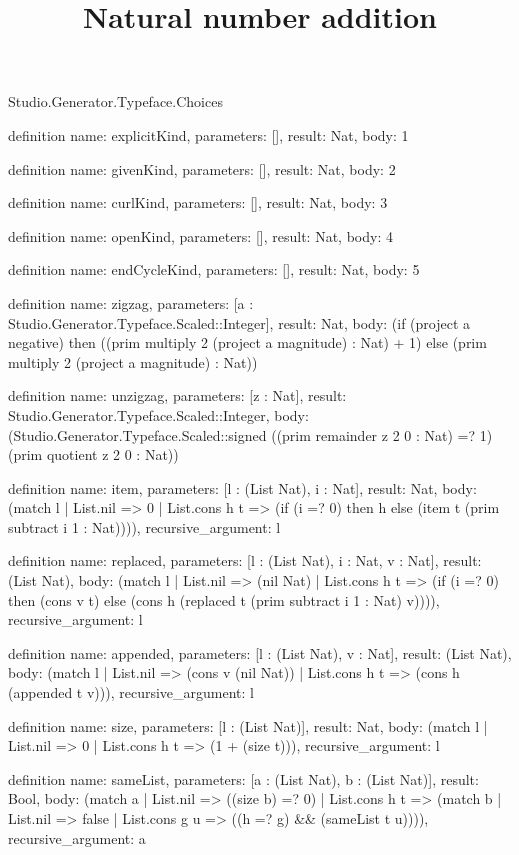 \begin{lexlean}{Studio.Generator.Typeface.Choices}
\title{Natural number addition}
\begin{semanticmodule}
definition{
  name: explicitKind,
  parameters: [],
  result: Nat,
  body: 1
}

definition{
  name: givenKind,
  parameters: [],
  result: Nat,
  body: 2
}

definition{
  name: curlKind,
  parameters: [],
  result: Nat,
  body: 3
}

definition{
  name: openKind,
  parameters: [],
  result: Nat,
  body: 4
}

definition{
  name: endCycleKind,
  parameters: [],
  result: Nat,
  body: 5
}

definition{
  name: zigzag,
  parameters: [a : Studio.Generator.Typeface.Scaled::Integer],
  result: Nat,
  body: (if (project a negative) then ((prim multiply 2 (project a magnitude) : Nat) + 1) else (prim multiply 2 (project a magnitude) : Nat))
}

definition{
  name: unzigzag,
  parameters: [z : Nat],
  result: Studio.Generator.Typeface.Scaled::Integer,
  body: (Studio.Generator.Typeface.Scaled::signed ((prim remainder z 2 0 : Nat) =? 1) (prim quotient z 2 0 : Nat))
}

definition{
  name: item,
  parameters: [l : (List Nat), i : Nat],
  result: Nat,
  body: (match l
    | List.nil => 0
    | List.cons h t => (if (i =? 0) then h else (item t (prim subtract i 1 : Nat)))),
  recursive_argument: l
}

definition{
  name: replaced,
  parameters: [l : (List Nat), i : Nat, v : Nat],
  result: (List Nat),
  body: (match l
    | List.nil => (nil Nat)
    | List.cons h t => (if (i =? 0) then (cons v t) else (cons h (replaced t (prim subtract i 1 : Nat) v)))),
  recursive_argument: l
}

definition{
  name: appended,
  parameters: [l : (List Nat), v : Nat],
  result: (List Nat),
  body: (match l
    | List.nil => (cons v (nil Nat))
    | List.cons h t => (cons h (appended t v))),
  recursive_argument: l
}

definition{
  name: size,
  parameters: [l : (List Nat)],
  result: Nat,
  body: (match l
    | List.nil => 0
    | List.cons h t => (1 + (size t))),
  recursive_argument: l
}

definition{
  name: sameList,
  parameters: [a : (List Nat), b : (List Nat)],
  result: Bool,
  body: (match a
    | List.nil => ((size b) =? 0)
    | List.cons h t => (match b
    | List.nil => false
    | List.cons g u => ((h =? g) && (sameList t u)))),
  recursive_argument: a
}


\end{semanticmodule}
\end{lexlean}
